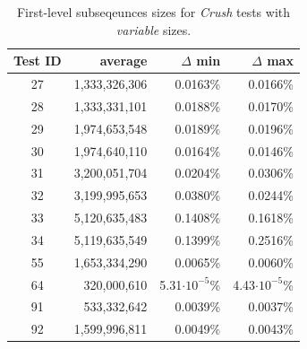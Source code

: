 \documentclass[
  digital,     %
  oneside,     %
  nosansbold,  %
  nocolorbold, %
  nolof,         %
  nolot,         %
]{fithesis4}
\begin{document}
\begin{table}[h]
  \begin{tabularx}{0.75\textwidth}{c|r|r|r}
    Test ID & average & $\Delta$ min & $\Delta$ max\\
    \midrule
    27&1,333,326,306&0.0163\%&0.0166\%\\
    28&1,333,331,101&0.0188\%&0.0170\%\\	
    29&1,974,653,548&0.0189\%&0.0196\%	\\
    30&1,974,640,110&0.0164\%&0.0146\%	\\
    31&3,200,051,704&0.0204\%&0.0306\%	\\
    32&3,199,995,653&0.0380\%&0.0244\%	\\
    33&5,120,635,483&0.1408\%&0.1618\%	\\
    34&5,119,635,549&0.1399\%&0.2516\%	\\
    55&1,653,334,290&0.0065\%&0.0060\%	\\
    64&320,000,610&5.31$\cdot10^{-5}$\% &4.43$\cdot10^{-5}$\%\\
    91&533,332,642&0.0039\%&0.0037\%	\\
    92&1,599,996,811&0.0049\%&0.0043\%\\

  \end{tabularx}
  \caption{First-level subseqeunces sizes for \emph{Crush} tests with \emph{variable} sizes.}
  \label{tab:analysis_crush_variable}
\end{table}
\end{document}
